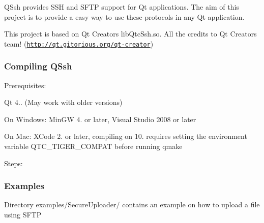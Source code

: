 Q\+Ssh provides S\+SH and S\+F\+TP support for Qt applications. The aim of this project is to provide a easy way to use these protocols in any Qt application.

This project is based on Qt Creator\textquotesingle{}s lib\+Qtc\+Ssh.\+so. All the credits to Qt Creator\textquotesingle{}s team! (\href{http://qt.gitorious.org/qt-creator}{\tt http\+://qt.\+gitorious.\+org/qt-\/creator})

\subsubsection*{Compiling Q\+Ssh}

Prerequisites\+:
\begin{DoxyItemize}
\item Qt 4.. (May work with older versions)
\item On Windows\+: Min\+GW 4. or later, Visual Studio 2008 or later
\item On Mac\+: X\+Code 2. or later, compiling on 10. requires setting the environment variable Q\+T\+C\+\_\+\+T\+I\+G\+E\+R\+\_\+\+C\+O\+M\+P\+AT before running qmake
\end{DoxyItemize}

Steps\+: 


\subsubsection*{Examples}

Directory examples/\+Secure\+Uploader/ contains an example on how to upload a file using S\+F\+TP 